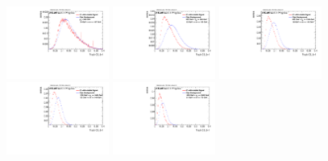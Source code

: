\begin{figure}
\includegraphics[width=0.3\textwidth]{sascha_input/Appendix/Distributions/higgs/distributions/beta1/h_normal_tj_C2_bin1.pdf} \hspace{1mm}
\includegraphics[width=0.3\textwidth]{sascha_input/Appendix/Distributions/higgs/distributions/beta1/h_normal_tj_C2_bin2.pdf} \hspace{4mm}
\includegraphics[width=0.3\textwidth]{sascha_input/Appendix/Distributions/higgs/distributions/beta1/h_normal_tj_C2_bin3.pdf} 
\bigskip
\includegraphics[width=0.3\textwidth]{sascha_input/Appendix/Distributions/higgs/distributions/beta1/h_normal_tj_C2_bin4.pdf} \hspace{4mm}
\includegraphics[width=0.3\textwidth]{sascha_input/Appendix/Distributions/higgs/distributions/beta1/h_normal_tj_C2_bin5.pdf} 


\end{figure}
